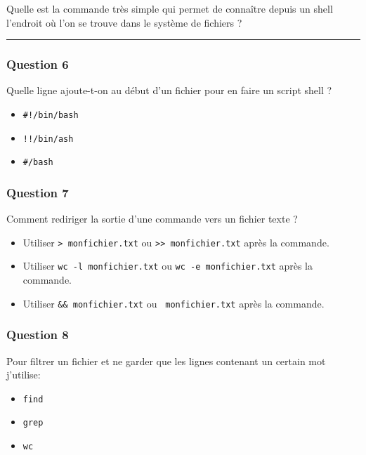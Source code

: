 \documentclass[
]{article}
\providecommand{\tightlist}{%
  \setlength{\itemsep}{0pt}\setlength{\parskip}{0pt}}
\begin{document}
Quelle est la commande très simple qui permet de connaître depuis un
shell l'endroit où l'on se trouve dans le système de fichiers ?

\begin{center}\rule{0.5\linewidth}{\linethickness}\end{center}

\hypertarget{question-6}{%
\subsubsection{Question 6}\label{question-6}}

Quelle ligne ajoute-t-on au début d'un fichier pour en faire un script
shell ?

\begin{itemize}
\tightlist
\item
  \texttt{\#!/bin/bash}
\item
  \texttt{!!/bin/ash}
\item
  \texttt{\#/bash}
\end{itemize}

\hypertarget{question-7}{%
\subsubsection{Question 7}\label{question-7}}

Comment rediriger la sortie d'une commande vers un fichier texte ?

\begin{itemize}
\tightlist
\item
  Utiliser \texttt{\textgreater{}\ monfichier.txt} ou
  \texttt{\textgreater{}\textgreater{}\ monfichier.txt} après la
  commande.
\item
  Utiliser \texttt{wc\ -l\ monfichier.txt} ou
  \texttt{wc\ -e\ monfichier.txt} après la commande.
\item
  Utiliser \texttt{\&\&\ monfichier.txt} ou
  \texttt{\textbar{}\textbar{}\ monfichier.txt} après la commande.
\end{itemize}

\hypertarget{question-8}{%
\subsubsection{Question 8}\label{question-8}}

Pour filtrer un fichier et ne garder que les lignes contenant un certain
mot j'utilise:

\begin{itemize}
\tightlist
\item
  \texttt{find}
\item
  \texttt{grep}
\item
  \texttt{wc}
\end{itemize}
\end{document}
